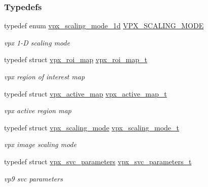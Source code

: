 \subsubsection*{Typedefs}
\begin{DoxyCompactItemize}
\item 
typedef enum \hyperlink{group__vp8__encoder_ga70071b1bb6cac9a1ef0ea3d8362ff94f}{vpx\+\_\+scaling\+\_\+mode\+\_\+1d} \hyperlink{group__vp8__encoder_ga100ca891ad96995e61780ae777bf8663}{V\+P\+X\+\_\+\+S\+C\+A\+L\+I\+N\+G\+\_\+\+M\+O\+D\+E}
\begin{DoxyCompactList}\small\item\em vpx 1-\/\+D scaling mode \end{DoxyCompactList}\item 
typedef struct \hyperlink{structvpx__roi__map}{vpx\+\_\+roi\+\_\+map} \hyperlink{group__vp8__encoder_ga5be1a94d436a5e9296f5be06f57ccbd1}{vpx\+\_\+roi\+\_\+map\+\_\+t}
\begin{DoxyCompactList}\small\item\em vpx region of interest map \end{DoxyCompactList}\item 
typedef struct \hyperlink{structvpx__active__map}{vpx\+\_\+active\+\_\+map} \hyperlink{group__vp8__encoder_ga7b48f7962f5061979f0f8ece6fb1cba8}{vpx\+\_\+active\+\_\+map\+\_\+t}
\begin{DoxyCompactList}\small\item\em vpx active region map \end{DoxyCompactList}\item 
typedef struct \hyperlink{structvpx__scaling__mode}{vpx\+\_\+scaling\+\_\+mode} \hyperlink{group__vp8__encoder_ga9600359ed9096cd96c621d9cf6c8df38}{vpx\+\_\+scaling\+\_\+mode\+\_\+t}
\begin{DoxyCompactList}\small\item\em vpx image scaling mode \end{DoxyCompactList}\item 
typedef struct \hyperlink{structvpx__svc__parameters}{vpx\+\_\+svc\+\_\+parameters} \hyperlink{group__vp8__encoder_gaf01e78e24ae1cb54e8a455d74f3c31c8}{vpx\+\_\+svc\+\_\+parameters\+\_\+t}
\begin{DoxyCompactList}\small\item\em vp9 svc parameters \end{DoxyCompactList}\end{DoxyCompactItemize}
